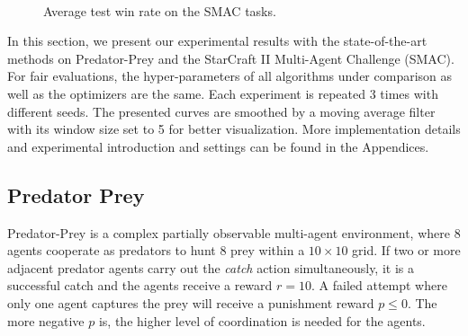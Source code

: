 \begin{figure}[ht!]
{        }%
    \\    
    \caption{Average test win rate on the SMAC tasks.}
    \label{exp_smac}
\end{figure}
In this section, we present our experimental results with the state-of-the-art methods on Predator-Prey and the StarCraft II Multi-Agent Challenge (SMAC)\cite{samvelyan2019starcraft}. For fair evaluations, the hyper-parameters of all algorithms under comparison as well as the optimizers are the same. Each experiment is repeated 3 times with different seeds. The presented curves are smoothed by a moving average filter with its window size set to 5 for better visualization. More implementation details and experimental introduction and settings can be found in the Appendices. 


\subsection{Predator Prey}
Predator-Prey is a complex partially observable multi-agent environment, where  8 agents cooperate as predators to hunt 8 prey within a  $10 \times 10$ grid. If two or more adjacent predator agents carry out the \textit{catch} action simultaneously, it is a  successful catch and the agents receive a reward $r = 10$. A failed attempt where only one agent captures the prey will receive a punishment reward $p \leq 0$. The more negative $p$ is, the higher level of coordination is needed for the agents. 



